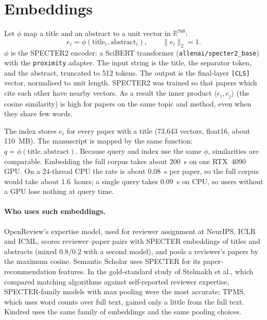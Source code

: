 \documentclass[11pt]{article}
\newcommand{\Rset}{\mathbb{R}}
\begin{document}
\section{Embeddings}
Let $\phi$ map a title and an abstract to a unit vector in $\Rset^{768}$:
\[
  e_i = \phi(\text{title}_i, \text{abstract}_i), \qquad \|e_i\|_2 = 1 .
\]
$\phi$ is the SPECTER2 encoder: a SciBERT transformer (\texttt{allenai/specter2\_base}) with the \texttt{proximity} adapter. The input string is the title, the separator token, and the abstract, truncated to 512 tokens. The output is the final-layer \texttt{[CLS]} vector, normalised to unit length. SPECTER2 was trained so that papers which cite each other have nearby vectors. As a result the inner product $\langle e_i, e_j\rangle$ (the cosine similarity) is high for papers on the same topic and method, even when they share few words.

The index stores $e_i$ for every paper with a title (73{,}643 vectors, float16, about 110~MB). The manuscript is mapped by the same function: $q = \phi(\text{title}, \text{abstract})$. Because query and index use the same $\phi$, similarities are comparable. Embedding the full corpus takes about 200~s on one RTX~4090 GPU. On a 24-thread CPU the rate is about 0.08~s per paper, so the full corpus would take about 1.6~hours; a single query takes 0.09~s on CPU, so users without a GPU lose nothing at query time.

\paragraph{Who uses such embeddings.} OpenReview's expertise model, used for reviewer assignment at NeurIPS, ICLR and ICML, scores reviewer--paper pairs with SPECTER embeddings of titles and abstracts (mixed 0.8/0.2 with a second model), and pools a reviewer's papers by the maximum cosine. Semantic Scholar uses SPECTER for its paper-recommendation features. In the gold-standard study of Stelmakh et al., which compared matching algorithms against self-reported reviewer expertise, SPECTER-family models with max pooling were the most accurate; TPMS, which uses word counts over full text, gained only a little from the full text. Kindred uses the same family of embeddings and the same pooling choices.
\end{document}
